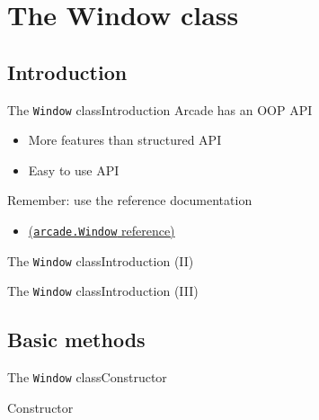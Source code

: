 \documentclass[10pt,compress]{beamer} %
\begin{document}
\section{The Window class}
\subsection{Introduction}

\begin{frame}{The \texttt{Window} class}{Introduction}
	Arcade has an OOP API
	\begin{itemize}
		\item More features than structured API
		\item Easy to use API
	\end{itemize}
	Remember: use the reference documentation
	\begin{itemize}
		\item \href{https://api.arcade.academy/en/latest/api/window.html}{(\texttt{arcade.Window} reference)}
	\end{itemize}
\end{frame}

\begin{frame}{The \texttt{Window} class}{Introduction (II)}
	\begin{exampleblock}{}
		\vspace{-0.2cm}
		
		\vspace{-0.2cm}
	\end{exampleblock}
\end{frame}

\begin{frame}{The \texttt{Window} class}{Introduction (III)}
	\begin{exampleblock}{}
		\vspace{-0.2cm}
		
		\vspace{-0.2cm}
	\end{exampleblock}
\end{frame}

\subsection{Basic methods}

\begin{frame}{The \texttt{Window} class}{Constructor}
	\begin{block}{Constructor}
		\vspace{-0.2cm}
		
		\vspace{-0.2cm}
	\end{block}	
\end{frame}
\end{document}
